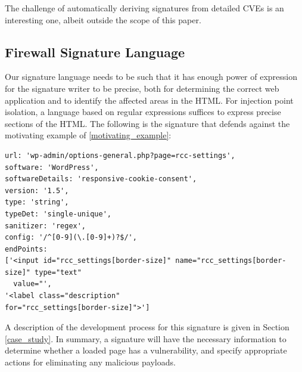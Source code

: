 The challenge of automatically deriving signatures from detailed CVEs is an interesting
one, albeit outside the scope of this paper.


 \subsection{Firewall Signature Language} \label{signature_language}

 Our signature language needs to be such that it has enough power of
 expression for the signature writer to be precise, both for
 determining the correct web application and to identify the affected
 areas in the HTML. For injection point isolation, a language based on
 regular expressions suffices to express precise
 sections of the HTML. The following is the signature that defends
 against the motivating example of \autoref{motivating_example}:

 \begin{lstlisting}[breaklines=true,caption={An \sys signature},label={lst:xsnare_signature}]
url: 'wp-admin/options-general.php?page=rcc-settings',
software: 'WordPress',
softwareDetails: 'responsive-cookie-consent',
version: '1.5',
type: 'string',
typeDet: 'single-unique',
sanitizer: 'regex',
config: '/^[0-9](\.[0-9]+)?$/',
endPoints: 
['<input id="rcc_settings[border-size]" name="rcc_settings[border-size]" type="text"
  value="',
'<label class="description" 
for="rcc_settings[border-size]">']
\end{lstlisting}

A description of the development process for this signature is given
in Section \ref{case_study}. In summary, a signature will have the
necessary information to determine whether a loaded page has a
vulnerability, and specify appropriate actions for eliminating
any malicious payloads.

